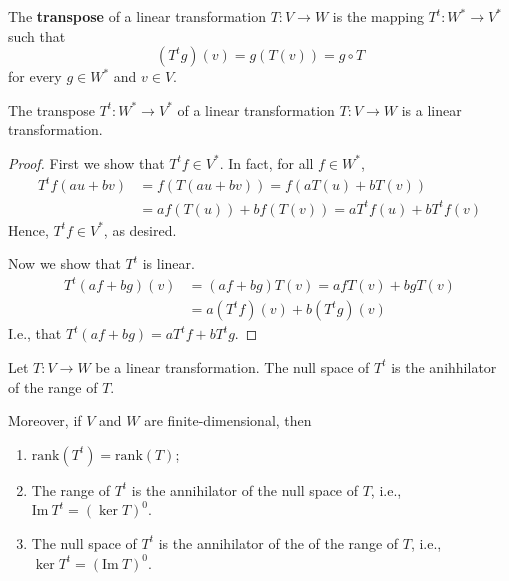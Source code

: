 \begin{definition}[Transpose]
	The \textbf{transpose} of a linear transformation $T : V \longrightarrow W$ is the mapping 	$T^t : W^\ast \longrightarrow V^\ast$ such that
	\[
		(T^tg)(v) = g(T(v)) = g \circ T
	\]
	for every $g \in W^\ast$ and $v \in V$.
\end{definition}

\begin{theorem}
	The transpose $T^t : W^\ast \longrightarrow V^\ast$ of a linear transformation $T : V \longrightarrow W$ is a linear transformation.
\end{theorem}

\begin{proof}
	First we show that $T^t f \in V^\ast$. In fact, for all $f \in W^\ast$,
	\begin{equation*}
		\begin{aligned}
			T^t f(au+bv) &= f(T(au+bv)) = f(aT(u) + bT(v)) \\
			&= af(T(u)) + bf(T(v)) = aT^t f(u) + bT^t f(v)
		\end{aligned}
	\end{equation*}
	Hence, $T^t f \in V^\ast$, as desired.
	
	Now we show that $T^t$ is linear.
	\begin{equation*}
		\begin{aligned}
			T^t (af+bg)(v) &= (af+bg)T(v) = afT(v) + bgT(v) \\
			&= a(T^tf)(v) + b(T^t g)(v)
		\end{aligned}
	\end{equation*}
	I.e., that $T^t(af+bg) = aT^tf + bT^t g$.
\end{proof}


\begin{theorem}
	Let $T : V \longrightarrow W$ be a linear transformation. The null space of $T^t$ is the anihhilator of the range of $T$.
	
	Moreover, if $V$ and $W$ are finite-dimensional, then
	\begin{enumerate}
		\item $\text{rank}(T^t) = \text{rank}(T)$;
		\item The range of $T^t$ is the annihilator of the null space of $T$, i.e., $\text{Im}~T^t = (\ker T)^0$.
		\item The null space of $T^t$ is the annihilator of the of the range of $T$, i.e., $\ker T^t = (\text{Im}~T)^0$.
	\end{enumerate}
\end{theorem}

